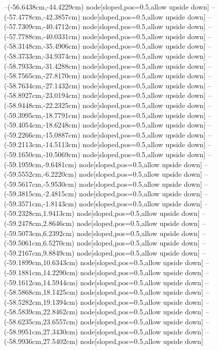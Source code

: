 --(-56.6438cm,-44.4229cm) node[sloped,pos=0.5,allow upside down]{\ArrowIn}
--(-57.4778cm,-42.3857cm) node[sloped,pos=0.5,allow upside down]{\ArrowIn}
--(-57.7309cm,-40.4712cm) node[sloped,pos=0.5,allow upside down]{\ArrowIn}
--(-57.7788cm,-40.0331cm) node[sloped,pos=0.5,allow upside down]{\arrowIn}
--(-58.3148cm,-35.4906cm) node[sloped,pos=0.5,allow upside down]{\ArrowIn}
--(-58.3733cm,-34.9374cm) node[sloped,pos=0.5,allow upside down]{\arrowIn}
--(-58.7933cm,-31.4288cm) node[sloped,pos=0.5,allow upside down]{\ArrowIn}
--(-58.7565cm,-27.8170cm) node[sloped,pos=0.5,allow upside down]{\ArrowIn}
--(-58.7634cm,-27.1432cm) node[sloped,pos=0.5,allow upside down]{\arrowIn}
--(-58.8927cm,-23.0194cm) node[sloped,pos=0.5,allow upside down]{\ArrowIn}
--(-58.9448cm,-22.2325cm) node[sloped,pos=0.5,allow upside down]{\arrowIn}
--(-59.3995cm,-18.7791cm) node[sloped,pos=0.5,allow upside down]{\ArrowIn}
--(-59.4054cm,-18.6248cm) node[sloped,pos=0.5,allow upside down]{\arrowIn}
--(-59.2266cm,-15.0887cm) node[sloped,pos=0.5,allow upside down]{\ArrowIn}
--(-59.2113cm,-14.5113cm) node[sloped,pos=0.5,allow upside down]{\arrowIn}
--(-59.1650cm,-10.5069cm) node[sloped,pos=0.5,allow upside down]{\ArrowIn}
--(-59.1959cm,-9.6481cm) node[sloped,pos=0.5,allow upside down]{\arrowIn}
--(-59.5552cm,-6.2220cm) node[sloped,pos=0.5,allow upside down]{\ArrowIn}
--(-59.5617cm,-5.9530cm) node[sloped,pos=0.5,allow upside down]{\arrowIn}
--(-59.3815cm,-2.4815cm) node[sloped,pos=0.5,allow upside down]{\ArrowIn}
--(-59.3571cm,-1.8143cm) node[sloped,pos=0.5,allow upside down]{\arrowIn}
--(-59.2328cm,1.9413cm) node[sloped,pos=0.5,allow upside down]{\ArrowIn}
--(-59.2478cm,2.8646cm) node[sloped,pos=0.5,allow upside down]{\arrowIn}
--(-59.5073cm,6.2392cm) node[sloped,pos=0.5,allow upside down]{\ArrowIn}
--(-59.5061cm,6.5270cm) node[sloped,pos=0.5,allow upside down]{\arrowIn}
--(-59.2167cm,9.8849cm) node[sloped,pos=0.5,allow upside down]{\ArrowIn}
--(-59.1899cm,10.6343cm) node[sloped,pos=0.5,allow upside down]{\arrowIn}
--(-59.1881cm,14.2290cm) node[sloped,pos=0.5,allow upside down]{\ArrowIn}
--(-59.1612cm,14.5944cm) node[sloped,pos=0.5,allow upside down]{\arrowIn}
--(-58.5868cm,18.1425cm) node[sloped,pos=0.5,allow upside down]{\ArrowIn}
--(-58.5282cm,19.1394cm) node[sloped,pos=0.5,allow upside down]{\arrowIn}
--(-58.5839cm,22.8462cm) node[sloped,pos=0.5,allow upside down]{\ArrowIn}
--(-58.6235cm,23.6557cm) node[sloped,pos=0.5,allow upside down]{\arrowIn}
--(-58.9951cm,27.3430cm) node[sloped,pos=0.5,allow upside down]{\ArrowIn}
--(-58.9936cm,27.5402cm) node[sloped,pos=0.5,allow upside down]{\arrowIn}
